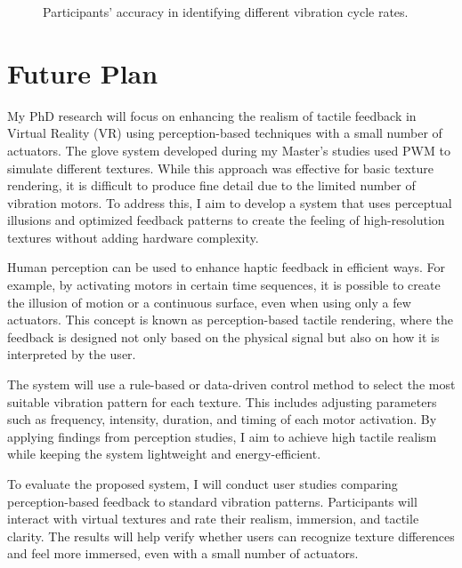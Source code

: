 \documentclass[graybox]{svmult}
\begin{document}
\begin{figure}\centering
	
	\caption{Participants' accuracy in identifying different vibration cycle rates.}\label{fig:questionnaire_results}
\end{figure}


\section{Future Plan}

My PhD research will focus on enhancing the realism of tactile feedback in Virtual Reality (VR) using perception-based techniques with a small number of actuators. The glove system developed during my Master’s studies used PWM to simulate different textures. While this approach was effective for basic texture rendering, it is difficult to produce fine detail due to the limited number of vibration motors. To address this, I aim to develop a system that uses perceptual illusions and optimized feedback patterns to create the feeling of high-resolution textures without adding hardware complexity.

Human perception can be used to enhance haptic feedback in efficient ways. For example, by activating motors in certain time sequences, it is possible to create the illusion of motion or a continuous surface, even when using only a few actuators. This concept is known as perception-based tactile rendering, where the feedback is designed not only based on the physical signal but also on how it is interpreted by the user.

The system will use a rule-based or data-driven control method to select the most suitable vibration pattern for each texture. This includes adjusting parameters such as frequency, intensity, duration, and timing of each motor activation. By applying findings from perception studies, I aim to achieve high tactile realism while keeping the system lightweight and energy-efficient.

To evaluate the proposed system, I will conduct user studies comparing perception-based feedback to standard vibration patterns. Participants will interact with virtual textures and rate their realism, immersion, and tactile clarity. The results will help verify whether users can recognize texture differences and feel more immersed, even with a small number of actuators.
\end{document}
